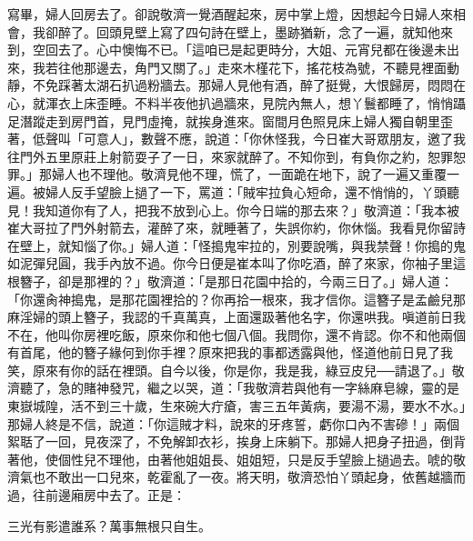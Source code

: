 寫畢，婦人回房去了。卻說敬濟一覺酒醒起來，房中掌上燈，因想起今日婦人來相會，我卻醉了。回頭見壁上寫了四句詩在壁上，墨跡猶新，念了一遍，就知他來到，空回去了。心中懊悔不已。「這咱已是起更時分，大姐、元宵兒都在後邊未出來，我若往他那邊去，角門又關了。」走來木槿花下，搖花枝為號，不聽見裡面動靜，不免踩著太湖石扒過粉牆去。那婦人見他有酒，醉了挺覺，大恨歸房，悶悶在心，就渾衣上床歪睡。不料半夜他扒過牆來，見院內無人，想丫鬟都睡了，悄悄躡足潛蹤走到房門首，見門虛掩，就挨身進來。窗間月色照見床上婦人獨自朝里歪著，低聲叫「可意人」，數聲不應，說道：「你休怪我，今日崔大哥眾朋友，邀了我往門外五里原莊上射箭耍子了一日，來家就醉了。不知你到，有負你之約，恕罪恕罪。」那婦人也不理他。敬濟見他不理，慌了，一面跪在地下，說了一遍又重覆一遍。被婦人反手望臉上撾了一下，罵道：「賊牢拉負心短命，還不悄悄的，丫頭聽見！我知道你有了人，把我不放到心上。你今日端的那去來？」敬濟道：「我本被崔大哥拉了門外射箭去，灌醉了來，就睡著了，失誤你約，你休惱。我看見你留詩在壁上，就知惱了你。」婦人道：「怪搗鬼牢拉的，別要說嘴，與我禁聲！你搗的鬼如泥彈兒圓，我手內放不過。你今日便是崔本叫了你吃酒，醉了來家，你袖子里這根簪子，卻是那裡的？」敬濟道：「是那日花園中拾的，今兩三日了。」婦人道：「你還肏神搗鬼，是那花園裡拾的？你再拾一根來，我才信你。這簪子是孟鹼兒那麻淫婦的頭上簪子，我認的千真萬真，上面還趿著他名字，你還哄我。嗔道前日我不在，他叫你房裡吃飯，原來你和他七個八個。我問你，還不肯認。你不和他兩個有首尾，他的簪子緣何到你手裡？原來把我的事都透露與他，怪道他前日見了我笑，原來有你的話在裡頭。自今以後，你是你，我是我，綠豆皮兒──請退了。」敬濟聽了，急的賭神發咒，繼之以哭，道：「我敬濟若與他有一字絲麻皂線，靈的是東嶽城隍，活不到三十歲，生來碗大疔瘡，害三五年黃病，要湯不湯，要水不水。」那婦人終是不信，說道：「你這賊才料，說來的牙疼誓，虧你口內不害磣！」兩個絮聒了一回，見夜深了，不免解卸衣衫，挨身上床躺下。那婦人把身子扭過，倒背著他，使個性兒不理他，由著他姐姐長、姐姐短，只是反手望臉上撾過去。唬的敬濟氣也不敢出一口兒來，乾霍亂了一夜。將天明，敬濟恐怕丫頭起身，依舊越牆而過，往前邊廂房中去了。正是：

三光有影遣誰系？萬事無根只自生。

